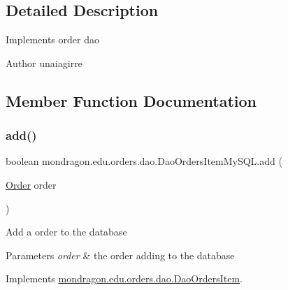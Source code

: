 \subsection{Detailed Description}
Implements order dao

\begin{DoxyAuthor}{Author}
unaiagirre 
\end{DoxyAuthor}


\subsection{Member Function Documentation}
\mbox{\label{classmondragon_1_1edu_1_1orders_1_1dao_1_1_dao_orders_item_my_s_q_l_a3147aedbffd26a4549675f21a3f97785}} 
\subsubsection{\texorpdfstring{add()}{add()}}
{\footnotesize\ttfamily boolean mondragon.\+edu.\+orders.\+dao.\+Dao\+Orders\+Item\+My\+S\+Q\+L.\+add (\begin{DoxyParamCaption}\item[{\mbox{\hyperlink{classmondragon_1_1edu_1_1clases_1_1_order}{Order}}}]{order }\end{DoxyParamCaption})\hspace{0.3cm}{\ttfamily [inline]}}

Add a order to the database


\begin{DoxyParams}{Parameters}
{\em order} & the order adding to the database \\
\hline
\end{DoxyParams}


Implements \mbox{\hyperlink{interfacemondragon_1_1edu_1_1orders_1_1dao_1_1_dao_orders_item}{mondragon.\+edu.\+orders.\+dao.\+Dao\+Orders\+Item}}.

\mbox{\label{classmondragon_1_1edu_1_1orders_1_1dao_1_1_dao_orders_item_my_s_q_l_a52ac975587e6f3d4fd85f9ad42bdca5a}} 
